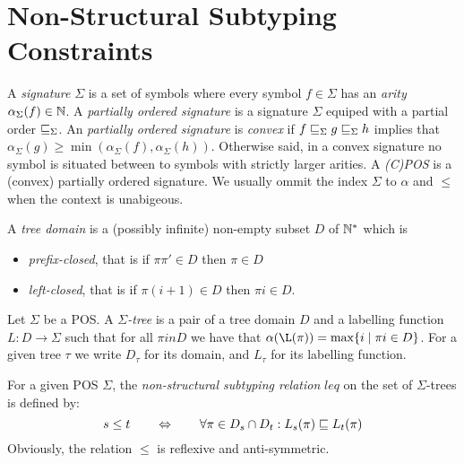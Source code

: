 \section{Non-Structural Subtyping Constraints}

A \emph{signature} $\Sigma$ is a set of symbols where every symbol
$f\in \Sigma$ has an \emph{arity} $\alpha_\Sigma(f) \in \mathbb{N}$. A
\emph{partially ordered signature} is a signature $\Sigma$ equiped
with a partial order $\sqsubseteq_\Sigma$. An \emph{partially ordered
  signature} is \emph{convex} if $f \sqsubseteq_\Sigma g \sqsubseteq_\Sigma h$
implies that $\alpha_\Sigma(g) \geq
\min(\alpha_\Sigma(f),\alpha_\Sigma(h))$. Otherwise said, in a convex
signature no symbol is situated between to symbols with strictly
larger arities. A \emph{(C)POS} is a (convex) partially ordered signature.
We usually ommit the index $\Sigma$ to $\alpha$ and $\leq$ when the
context is unabigeous.

A \emph{tree domain} is a (possibly infinite) non-empty subset $D$ of
$\mathbb{N}^*$ which is
\begin{itemize}
\item \emph{prefix-closed}, that is if $\pi\pi'\in D$ then $\pi \in D$
\item \emph{left-closed}, that is if $\pi (i+1)\in D$ then $\pi i\in D$.
\end{itemize}

Let $\Sigma$ be a POS. A \emph{$\Sigma$-tree} is a pair of a tree
domain $D$ and a labelling function $L\colon D \rightarrow \Sigma$
such that for all $\pi in D$ we have that $\alpha(\L(\pi)) = \max\{i
\mid \pi i\in D\}$. For a given tree $\tau$ we write $D_\tau$ for its
domain, and $L_\tau$ for its labelling function.

For a given POS $\Sigma$, the \emph{non-structural subtyping relation}
$leq$ on the set of $\Sigma$-trees is defined by:
\[
s \leq t \qquad \Leftrightarrow \qquad
\forall \pi \in D_s \cap D_t :  L_s(\pi) \sqsubseteq L_t(\pi)
\] 
Obviously, the relation $\leq$ is reflexive and anti-symmetric.

